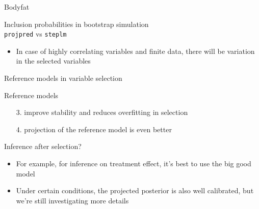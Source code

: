 \documentclass[english,t]{beamer}
\begin{document}
\begin{frame}{Bodyfat}

  \vspace{-0.55\baselineskip}
  Inclusion probabilities in bootstrap simulation\\
  \texttt{projpred} vs \texttt{steplm}


  \vspace{-1.5\baselineskip}
  \begin{itemize}
  \item<3> In case of highly correlating variables and finite data, there
    will be variation in the selected variables
  \end{itemize}

  
\end{frame}

\begin{frame}{Reference models in variable selection}

  Reference models
  \begin{itemize}
  \item[3.] improve stability and reduces overfitting in selection
  \item[4.] projection of the reference model is even better
  \end{itemize}

\end{frame}

\begin{frame}{Inference after selection?}

  \begin{itemize}
  \item For example, for inference on treatment effect, it's best to
    use the big good model
  \item Under certain conditions, the projected posterior is also well
    calibrated, but we're still investigating more details
  \end{itemize}

\end{frame}
\end{document}
